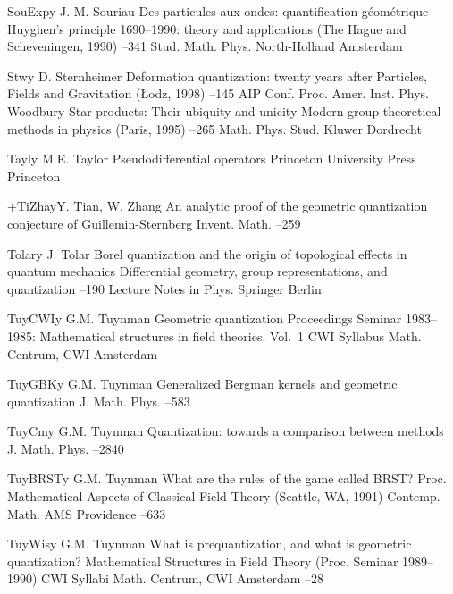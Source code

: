 \documentclass[12pt]{amsart}
\numberwithin{equation}{section}
\theoremstyle{remark}
\newcommand{\by}{\mathbf y}
\begin{document}
\begin{thebibliography}{199}
 SouExp\by{ J.-M. Souriau \paper Des particules aux ondes: quantification
g\'eom\'etrique \inbook Huyghen's principle 1690--1990: theory and applications
(The Hague and Scheveningen, 1990) --341 \bookinfo Stud. Math. Phys.
 \publ North-Holland \publaddr Amsterdam }

 Stw\by{ D. Sternheimer \paper Deformation quantization: twenty years
after \inbook Particles, Fields and Gravitation (\L odz, 1998) --145
\bookinfo AIP Conf. Proc.  \publ Amer. Inst. Phys. \publaddr Woodbury
 \moreref \paper Star products: Their ubiquity and unicity \inbook
Modern group theoretical methods in physics (Paris, 1995) --265
\bookinfo Math. Phys. Stud.  \publ Kluwer \publaddr Dordrecht }

 Tayl\by{ M.E. Taylor \book Pseudodifferential operators \publ Princeton
University Press \publaddr Princeton }

 +TiZha\by{Y. Tian, W. Zhang \paper An analytic proof of the geometric
quantization conjecture of Guillemin-Sternberg \jour Invent. Math. 
 --259}

 Tolar\by{ J. Tolar \paper Borel quantization and the origin of
topological effects in quantum mechanics \inbook Differential geometry, group
representations, and quantization --190 \bookinfo Lecture Notes in
Phys.  \publ Springer \publaddr Berlin }

 TuyCWI\by{ G.M. Tuynman \book Geometric quantization \bookinfo
Proceedings Seminar 1983--1985: Mathematical structures in field theories.
Vol.~1 \bookinfo CWI Syllabus  \publ Math. Centrum, CWI \publaddr
Amsterdam }

 TuyGBK\by{ G.M. Tuynman \paper Generalized Bergman kernels and geometric
quantization \jour J. Math. Phys.   --583}

 TuyCm\by{ G.M. Tuynman \paper Quantization: towards a comparison between
methods \jour J. Math. Phys.   --2840}

 TuyBRST\by{ G.M. Tuynman \paper What are the rules of the game called
BRST? \inbook Proc. Mathematical Aspects of Classical Field Theory (Seattle,
WA, 1991) \bookinfo Contemp. Math.  \publ AMS \publaddr Providence  --633}

 TuyWis\by{ G.M. Tuynman \paper What is prequantization, and what is
geometric quantization? \inbook  Mathematical Structures in Field Theory
(Proc. Seminar 1989--1990) \bookinfo CWI Syllabi  \publ Math. Centrum,
CWI \publaddr Amsterdam --28 }


\end{thebibliography}
\end{document}
